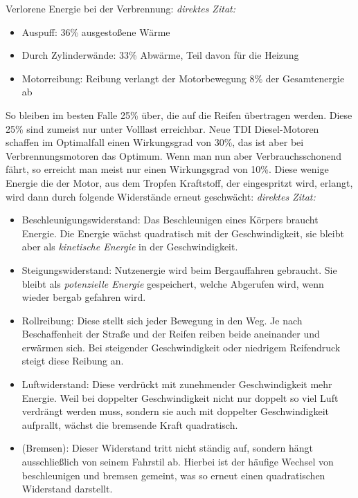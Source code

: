 Verlorene Energie bei der Verbrennung:
\textit{direktes Zitat: \cite{SIMR.CH1-Fahrstil-Analyse.Motorkennfeld}}
\begin{itemize}
	\item Auspuff: 36\% ausgestoßene Wärme
	\item Durch Zylinderwände: 33\% Abwärme, Teil davon für die Heizung
	\item Motorreibung: Reibung verlangt der Motorbewegung 8\% der Gesamtenergie ab
\end{itemize}
So bleiben im besten Falle 25\% über, die auf die Reifen übertragen werden. Diese 25\% sind zumeist nur unter Volllast erreichbar. Neue TDI Diesel-Motoren schaffen im Optimalfall einen Wirkungsgrad von 30\%, das ist aber bei Verbrennungsmotoren das Optimum. Wenn man nun aber Verbrauchsschonend fährt, so erreicht man meist nur einen Wirkungsgrad von 10\%.  Diese wenige Energie die der Motor, aus dem Tropfen Kraftstoff, der eingespritzt wird, erlangt, wird dann durch folgende Widerstände erneut geschwächt:
\textit{direktes Zitat: \cite{SIMR.CH1-Fahrstil-Analyse.Motorkennfeld}}
\begin{itemize}
	\item Beschleunigungswiderstand: Das Beschleunigen eines Körpers braucht Energie. Die Energie wächst quadratisch mit der Geschwindigkeit, sie bleibt aber als \textit{kinetische Energie} in der Geschwindigkeit. 
	\item Steigungswiderstand: Nutzenergie wird beim Bergauffahren gebraucht. Sie bleibt als \textit{potenzielle Energie} gespeichert, welche Abgerufen wird, wenn wieder bergab gefahren wird.
	\item Rollreibung: Diese stellt sich jeder Bewegung in den Weg. Je nach Beschaffenheit der Straße und der Reifen reiben beide aneinander und erwärmen sich. Bei steigender Geschwindigkeit oder niedrigem Reifendruck steigt diese Reibung an.
	\item Luftwiderstand: Diese verdrückt mit zunehmender Geschwindigkeit mehr Energie. Weil bei doppelter Geschwindigkeit nicht nur doppelt so viel Luft verdrängt werden muss, sondern sie auch mit doppelter Geschwindigkeit aufprallt, wächst die bremsende Kraft quadratisch. 
	\item (Bremsen): Dieser Widerstand tritt nicht ständig auf, sondern hängt ausschließlich von seinem Fahrstil ab. Hierbei ist der häufige Wechsel von beschleunigen und bremsen gemeint, was so erneut einen quadratischen Widerstand darstellt. 
\end{itemize}

